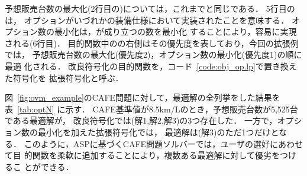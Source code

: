 予想販売台数の最大化(2行目の)については，これまでと同じである．
5行目のは，
オプションがいづれかの装備仕様において実装されたことを意味する．
オプション数の最小化は，が成り立つの数を最小化
することにより，容易に実現される(6行目)．
目的関数中のの右側はその優先度を表しており，今回の拡張例では，
予想販売台数の最大化(優先度2)，オプション数の最小化(優先度1)の順に最適
化される．
改良符号化の目的関数を，コード~\ref{code:obj_op.lp}で置き換えた符号化を
拡張符号化と呼ぶ．

図~\ref{fig:ovm_example}のCAFE問題に対して，最適解の全列挙をした結果を
表~\ref{tab:optN}
に示す．
CAFE基準値が8.5km/Lのとき，予想販売台数が5,525台である最適解が，
改良符号化では(解1,解2,解3)の3つ存在した．
一方で，オプション数の最小化を加えた拡張符号化では，
最適解は(解3)のただ1つだけとなる．
このように，ASPに基づくCAFE問題ソルバーでは，ユーザの選好にあわせて目
的関数を柔軟に追加することにより，複数ある最適解に対して優劣をつけるこ
とができる．



